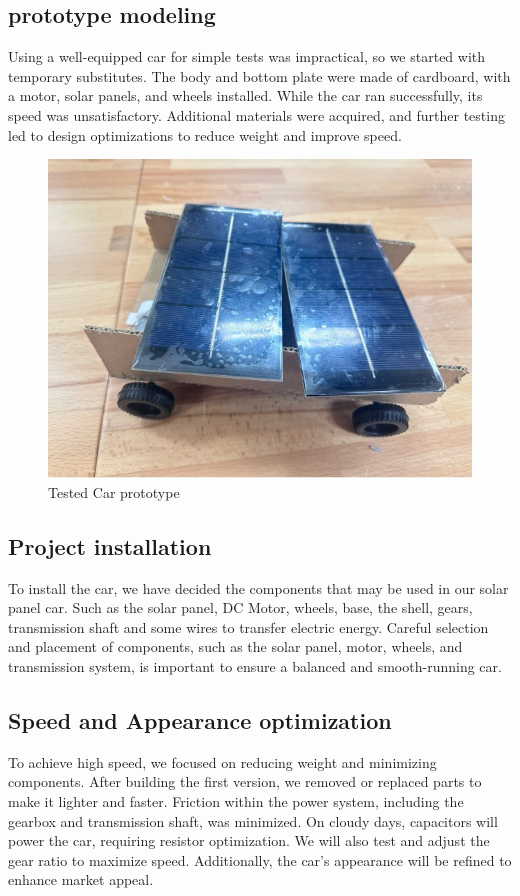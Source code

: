 \documentclass[12pt]{article}
\begin{document}
\subsection{prototype modeling}
Using a well-equipped car for simple tests was impractical, so we started with temporary substitutes. The body and bottom plate were made of cardboard, with a motor, solar panels, and wheels installed. While the car ran successfully, its speed was unsatisfactory. Additional materials were acquired, and further testing led to design optimizations to reduce weight and improve speed.
\begin{figure}[h] %
    \centering %
    \includegraphics[width=1\textwidth]{figure/car_prototype.jpg} %
    \caption{Tested Car prototype} %
\end{figure}
\subsection{Project installation}
To install the car, we have decided the components that may be used in our solar panel car.
Such as the solar panel, DC Motor, wheels, base, the shell, gears, transmission shaft and some wires to transfer electric energy. 
Careful selection and placement of components, such as the solar panel, motor, wheels, and transmission system, is important to ensure a balanced and smooth-running car\cite{Hapuwatte2017}. 
\subsection{Speed and Appearance optimization}
To achieve high speed, we focused on reducing weight and minimizing components. After building the first version, we removed or replaced parts to make it lighter and faster. 
Friction within the power system, including the gearbox and transmission shaft, was minimized. 
On cloudy days, capacitors will power the car, requiring resistor optimization. 
We will also test and adjust the gear ratio to maximize speed. Additionally, the car's appearance will be refined to enhance market appeal.
\end{document}

